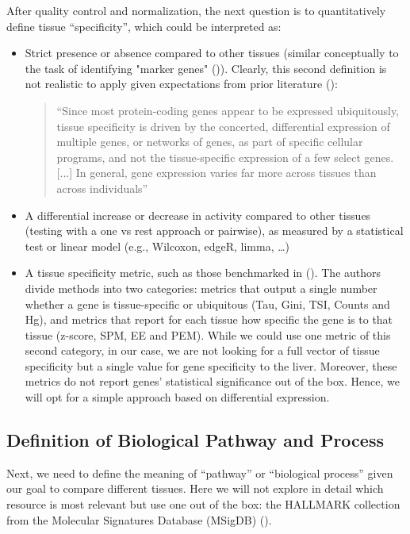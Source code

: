\documentclass{article}
\begin{document}
After quality control and normalization, the next question is to quantitatively define tissue “specificity”, which could be interpreted as:
\begin{itemize}
  \item Strict presence or absence compared to other tissues (similar conceptually to the task of identifying "marker genes" (\cite{Pullin2024-xv})). Clearly, this second definition is not realistic to apply given expectations from prior literature (\cite{Aguet2016-qm}):
  \begin{quote}
    “Since most protein-coding genes appear to be expressed ubiquitously, tissue specificity is driven by the concerted, differential expression of multiple genes, or networks of genes, as part of specific cellular programs, and not the tissue-specific expression of a few select genes. [...] In general, gene expression varies far more across tissues than across individuals”
  \end{quote}
  \item A differential increase or decrease in activity compared to other tissues (testing with a one vs rest approach or pairwise), as measured by a statistical test or linear model (e.g., Wilcoxon, edgeR, limma, …)
  \item A tissue specificity metric, such as those benchmarked in (\cite{Kryuchkova-Mostacci2017-vy}). The authors divide methods into two categories: metrics that output a single number whether a gene is tissue-specific or ubiquitous (Tau, Gini, TSI, Counts and Hg), and metrics that report for each tissue how specific the gene is to that tissue (z-score, SPM, EE and PEM). While we could use one metric of this second category, in our case, we are not looking for a full vector of tissue specificity but a single value for gene specificity to the liver. Moreover, these metrics do not report genes' statistical significance out of the box. Hence, we will opt for a simple approach based on differential expression.
\end{itemize}

\subsection{Definition of Biological Pathway and Process}

Next, we need to define the meaning of “pathway” or “biological process” given our goal to compare different tissues. Here we will not explore in detail which resource is most relevant but use one out of the box: the HALLMARK collection from the Molecular Signatures Database (MSigDB) (\cite{Liberzon2011-ex}).
\end{document}
